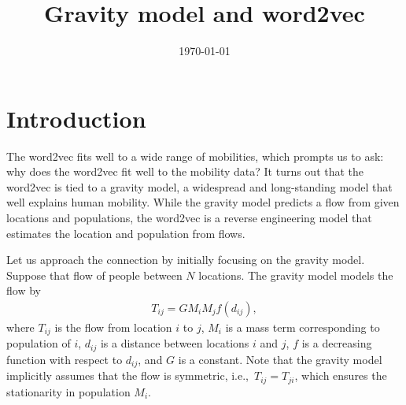 \documentclass[12pt]{article} %
\def\ie{i.e.,~}
\begin{document}

\title{Gravity model and word2vec} %
\date{\today}
\maketitle %

\section{Introduction}\label{sec:introduction}

The word2vec fits well to a wide range of mobilities, which prompts us to ask: why does the word2vec fit well to the mobility data?
It turns out that the word2vec is tied to a gravity model, a widespread and long-standing model that well explains human mobility.
While the gravity model predicts a flow from given locations and populations, the word2vec is a reverse engineering model that estimates the location and population from flows.

Let us approach the connection by initially focusing on the gravity model.
Suppose that flow of people between $N$ locations. The gravity model models the flow by
\begin{align}
    T_{ij} = G M_i M_j f(d_{ij}), \label{eq:gravity_model}
\end{align}
where $T_{ij}$ is the flow from location $i$ to $j$, $M_i$ is a mass term corresponding to population of $i$, $d_{ij}$ is a distance between locations $i$ and $j$,
$f$ is a decreasing function with respect to $d_{ij}$, and $G$ is a constant.
Note that the gravity model implicitly assumes that the flow is symmetric, \ie $T_{ij}=T_{ji}$, which ensures the stationarity in population $M_{i}$.
\end{document}
